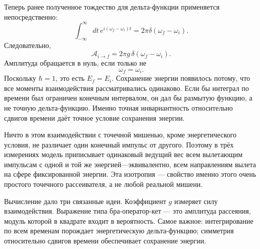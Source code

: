 Теперь ранее полученное тождество для дельта-функции применяется непосредственно:
\begin{equation}
\int_{-\infty}^{\infty}dt\,
e^{i(\omega_f-\omega_i)t}
=2\pi\delta(\omega_f-\omega_i).
\end{equation}
Следовательно,
\begin{equation}
\boxed{
\mathcal A_{i\to f}
=2\pi g\,\delta(\omega_f-\omega_i)
}.
\end{equation}
Амплитуда обращается в нуль, если только не
\begin{equation}
\omega_f=\omega_i.
\end{equation}
Поскольку \(\hbar=1\), это есть \(E_f=E_i\). Сохранение энергии появилось потому, что все моменты взаимодействия рассматривались одинаково. Если бы интеграл по времени был ограничен конечным интервалом, он дал бы размытую функцию, а не точную дельта-функцию. Именно точная инвариантность относительно сдвигов времени даёт точное условие сохранения энергии.

\begin{classroomqa}
\end{classroomqa}


Ничто в этом взаимодействии с точечной мишенью, кроме энергетического условия, не различает один конечный импульс от другого. Поэтому в трёх измерениях модель приписывает одинаковый ведущий вес всем вылетающим импульсам с одной и той же энергией---эквивалентно, всем направлениям вылета на сфере фиксированной энергии. Эта изотропия — свойство именно этого очень простого точечного рассеивателя, а не любой реальной мишени.

Вычисление дало три связанные идеи. Коэффициент \(g\) измеряет силу взаимодействия. Выражение типа бра-оператор-кет — это амплитуда рассеяния, модуль которой в квадрате входит в вероятность. Самое важное: интегрирование по всем временам порождает энергетическую дельта-функцию; симметрия относительно сдвигов времени обеспечивает сохранение энергии.


